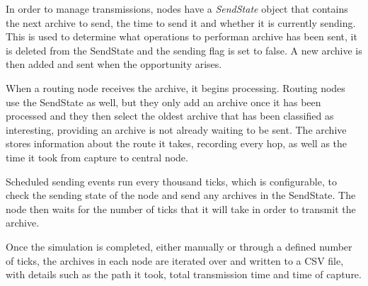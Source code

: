 	In order to manage transmissions, \DIFdelbegin {}\DIFdelend nodes have a \textit{SendState} object that contains the next archive to send, the time \DIFaddbegin {}\DIFaddend to send it and whether it is currently sending. This is used to determine what operations to perform\DIFdelbegin {}\DIFdelend \DIFaddbegin {}\DIFaddend an archive has been sent, it is deleted from the SendState and the sending flag is set to false. A new archive is then added and sent when the opportunity arises.

	When a routing node receives the archive, it begins processing. Routing nodes use the SendState as well, but they only add an archive once it has been processed and they then select the oldest archive that has been classified as interesting, providing an archive is not already waiting to be sent. The archive stores information about the route it takes, recording every hop, as well as the time it took from capture to central node.

	Scheduled sending events run every thousand ticks, which is configurable, to check the sending state of the node and send any archives in the SendState. The node then waits for the number of ticks that it will take in order to transmit the archive.

	Once the simulation is completed, either manually or through a defined number of ticks, the archives in each \DIFdelbegin {}\DIFdelend node are iterated over and written to a CSV file, with details such as the path it took, total transmission time and time of capture.

\subsection{\DIFdelbegin {}\DIFdelend \DIFaddbegin {}\DIFaddend }
\DIFdelbegin {}%


